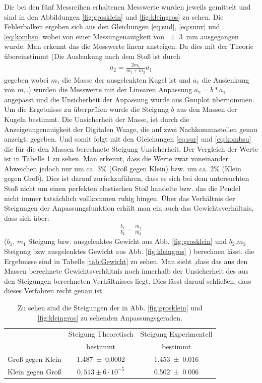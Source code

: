 Die bei den fünf Messreihen erhaltenen Messwerte wurden jeweils gemittelt und sind in den Abbildungen \ref{fig:grosklein} und \ref{fig:kleingros} zu sehen. Die Fehlerbalken ergeben sich aus den Gleichungen \ref{eq:sud}, \ref{eq:sunv} und \ref{eq:kombsu} wobei von einer Messungenauigkeit von \SI{+-3}{mm} ausgegangen wurde.
Man erkennt das die Messwerte linear ansteigen. Da dies mit der Theorie übereinstimmt (Die Auslenkung nach dem Stoß ist durch
\begin{align}
	a_2= \frac{2m_1}{m_1+m_2} a_1\label{eq:Auslenkung}
\end{align} 
gegeben wobei $m_1$ die Masse der ausgelenkten Kugel ist und $a_1$ die Auslenkung von $m_1$.)
wurden die Messwerte mit der Linearen Anpassung $a_2=b*a_1$ angepasst und die Unsicherheit der Anpassung wurde aus Gnuplot übernommen.
Um die Ergebnisse zu überprüfen wurde die Steigung $b$ aus den Massen der Kugeln bestimmt. Die Unsicherheit der Masse, ist durch die Anzeigeungenauigkeit der Digitalen Waage, die auf zwei Nachkommastellen genau anzeigt, gegeben. Und somit folgt mit den Gleichungen \ref{eq:sur} und \ref{eq:kombsu} die für die den Massen berechnete Steigung Unsicherheit. Der Vergleich der Werte ist in Tabelle \ref{tab:steigung} zu sehen.
Man erkennt, dass die Werte zwar voneinander Abweichen jedoch nur um ca. $3\%$ (Groß gegen Klein) bzw. um ca. $2\%$ (Klein gegen Groß). Dies ist darauf zurückzuführen, dass es sich bei dem untersuchten Stoß nicht um einen perfekten elastischen Stoß handelte bzw. das die Pendel nicht immer tatsächlich vollkommen ruhig hingen.
Über das Verhältnis der Steigungen der Anpassungsfunktion erhält man ein auch das Gewichtsverhältnis, dass sich über: 
\begin{align}
\frac{b_1}{b_2}=\frac{m_1}{m_2}	
\end{align} 
($b_1$, $m_1$ Steigung bzw. ausgelenktes Gewicht aus Abb. \ref{fig:grosklein} und $b_2$,$m_3$ Steigung bzw ausgelenktes Gewicht aus Abb. \ref{fig:kleingros} ) berechnen lässt. die Ergebnisse sind in Tabelle \ref{tab:Gewicht} zu sehen.
Man sieht ,dass das aus den Massen berechnete Gewichtsverhältnis  noch innerhalb der Unsicherheit des aus den Steigungen berechneten Verhältnisses liegt. Dies lässt darauf schließen, dass dieses Verfahren recht genau ist.

\begin{table}[h]
	\caption{Zu sehen sind die Steigungen der in Abb. \ref{fig:grosklein} und \ref{fig:kleingros} zu sehenden Anpassungsgeraden.}
	\begin{tabular}{|c|c|c|}
		\hline
		& Steigung Theoretisch & Steigung Experimentell\\
		& bestimmt & bestimmt\\
		\hline
		Groß gegen Klein &  \SI{1,487+-0,0002}{} & \SI{1,453+-0,016}{} \\
		\hline
		Klein gegen Groß & $0,513 \pm 6 \cdot 10^{-5}$&\SI{0,502+-0,006}{}\\
		\hline
	\end{tabular}
\label{tab:steigung}
\end{table}

